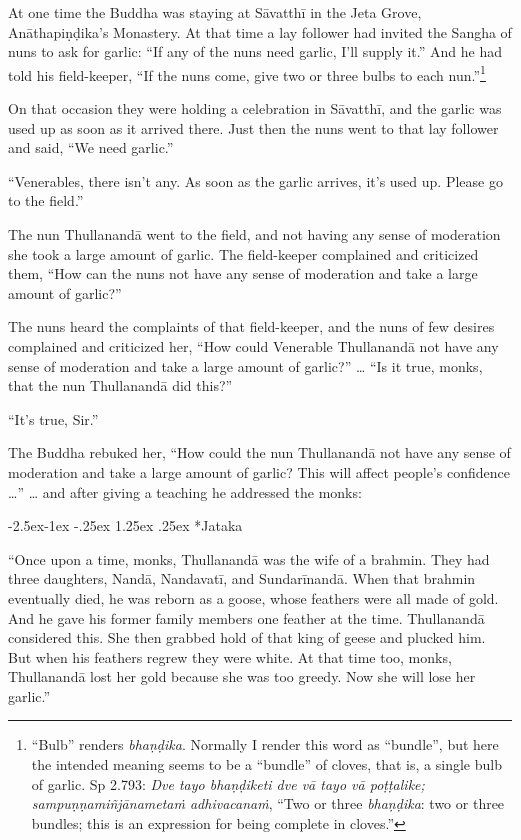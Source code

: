 \documentclass[12pt,openany]{book}%
\makeatletter
\renewcommand\subparagraph{\@startsection{subparagraph}{5}{\z@}%
            {-2.5ex\@plus -1ex \@minus -.25ex}%
            {1.25ex \@plus .25ex}%
            {\noindent\normalfont\itshape\footnotesize}}
\makeatother
\begin{document}
At one time the Buddha was staying at \textsanskrit{Sāvatthī} in the Jeta Grove, \textsanskrit{Anāthapiṇḍika}’s Monastery. At that time a lay follower had invited the Sangha of nuns to ask for garlic: “If any of the nuns need garlic, I’ll supply it.” And he had told his field-keeper, “If the nuns come, give two or three bulbs to each nun.”\footnote{“Bulb” renders \textit{\textsanskrit{bhaṇḍika}}. Normally I render this word as “bundle”, but here the intended meaning seems to be a “bundle” of cloves, that is, a single bulb of garlic. Sp 2.793: \textit{Dve tayo \textsanskrit{bhaṇḍiketi} dve \textsanskrit{vā} tayo \textsanskrit{vā} \textsanskrit{poṭṭalike}; \textsanskrit{sampuṇṇamiñjānametaṁ} \textsanskrit{adhivacanaṁ}}, “Two or three \textit{\textsanskrit{bhaṇḍika}}: two or three bundles; this is an expression for being complete in cloves.” } 

On that occasion they were holding a celebration in \textsanskrit{Sāvatthī}, and the garlic was used up as soon as it arrived there. Just then the nuns went to that lay follower and said, “We need garlic.” 

“Venerables, there isn’t any. As soon as the garlic arrives, it’s used up. Please go to the field.” 

The nun \textsanskrit{Thullanandā} went to the field, and not having any sense of moderation she took a large amount of garlic. The field-keeper complained and criticized them, “How can the nuns not have any sense of moderation and take a large amount of garlic?” 

The nuns heard the complaints of that field-keeper, and the nuns of few desires complained and criticized her, “How could Venerable \textsanskrit{Thullanandā} not have any sense of moderation and take a large amount of garlic?” … “Is it true, monks, that the nun \textsanskrit{Thullanandā} did this?” 

“It’s true, Sir.” 

The Buddha rebuked her, “How could the nun \textsanskrit{Thullanandā} not have any sense of moderation and take a large amount of garlic? This will affect people’s confidence …” … and after giving a teaching he addressed the monks: 

\subparagraph*{Jataka }

“Once upon a time, monks, \textsanskrit{Thullanandā} was the wife of a brahmin. They had three daughters, \textsanskrit{Nandā}, \textsanskrit{Nandavatī}, and \textsanskrit{Sundarīnandā}. When that brahmin eventually died, he was reborn as a goose, whose feathers were all made of gold. And he gave his former family members one feather at the time. \textsanskrit{Thullanandā} considered this. She then grabbed hold of that king of geese and plucked him. But when his feathers regrew they were white. At that time too, monks, \textsanskrit{Thullanandā} lost her gold because she was too greedy. Now she will lose her garlic.” 
\end{document}
